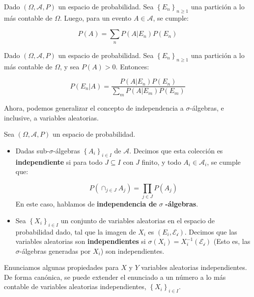 \begin{theorem}
	Dado $(\Omega, \mathcal{A}, P)$ un espacio de probabilidad. Sea $\left\{ E_n \right\}_{n \geq 1}$ una partición a lo más contable de $\Omega$. Luego, para un evento $A \in \mathcal{A}$, se cumple:

	\[
		P(A) = \sum_{n} P(A \vert E_n) P(E_n)
	\]

\end{theorem}

\begin{theorem}
	Dado $(\Omega, \mathcal{A}, P)$ un espacio de probabilidad. Sea $\left\{ E_n \right\}_{n \geq 1}$ una partición a lo más contable de $\Omega$, y sea $P(A) > 0$. Entonces:

	\[
		P(E_n \vert A) = \frac{ P(A \vert E_n) P(E_n) }{\sum_m P(A \vert E_m)P(E_m)}
	\]

\end{theorem}

Ahora, podemos generalizar el concepto de independencia a $\sigma$-álgebras, e inclusive, a variables aleatorias.

\begin{boxDef}
	Sea $(\Omega, \mathcal{A}, P)$ un espacio de probabilidad.
	\begin{itemize}
		\item Dadas sub-$\sigma$-álgebras $\left\{ A_i \right\}_{i \in I}$ de $\mathcal{A}$. Decimos que esta colección es \textbf{independiente} si para todo $J \subseteq I$ con $J$ finito, y todo $A_i \in \mathcal{A}_i$, se cumple que:

		\[
			P\left( \cap_{j \in J} A_j \right) = \prod_{j \in J} P(A_j)	
		\]
		En este caso, hablamos de \textbf{independencia de } $\sigma$ \textbf{-álgebras}. 

		\item Sea $\left\{ X_i \right\}_{i \in I}$ un conjunto de variables aleatorias en el espacio de probabilidad dado, tal que la imagen de $X_i$ es $(E_i, \mathcal{E_i})$. Decimos que las variables aleatorias son \textbf{independientes} si $\sigma (X_i) = X_i^{-1}(\mathcal{E_i})$ (Esto es, las $\sigma$-álgebras generadas por $X_i$) son independientes.
	\end{itemize}

\end{boxDef}

Enunciamos algunas propiedades para $X$ y $Y$ variables aleatorias independientes. De forma canónica, se puede extender el enunciado a un número a lo más contable de variables aleatorias independientes, $\left\{ X_i \right\}_{i \in I}$.

